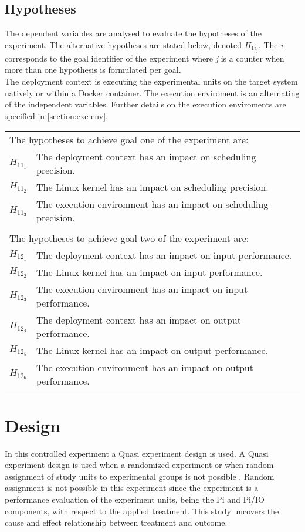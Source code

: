 \subsection{Hypotheses}
The dependent variables are analysed to evaluate the hypotheses of the experiment. The alternative hypotheses are stated below, denoted $H_{1i_{j}}$. The \textit{i} corresponds to the goal identifier of the experiment where \textit{j} is a counter when more than one hypothesis is formulated per goal.\\

The deployment context is executing the experimental units on the target system natively or within a Docker container. The execution enviroment is an alternating of the independent variables. Further details on the execution enviroments are specified in \ref{section:exe-env}.

\begin{table}[H]
\begin{tabular}{l|l}
\multicolumn{2}{l}{The hypotheses to achieve goal one of the experiment are:} \\
$H_{11_{1}}$ & The deployment context has an impact on scheduling precision. \\
$H_{11_{2}}$ & The Linux kernel has an impact on scheduling precision. \\
$H_{11_{3}}$ & The execution environment has an impact on scheduling precision. \\          
\multicolumn{2}{l}{} \\
\multicolumn{2}{l}{The hypotheses to achieve goal two of the experiment are:} \\
$H_{12_{1}}$ & The deployment context has an impact on input performance.\\
$H_{12_{2}}$ & The Linux kernel has an impact on input performance.\\
$H_{12_{3}}$ & The execution environment has an impact on input performance.\\
$H_{12_{4}}$ & The deployment context has an impact on output performance.\\
$H_{12_{5}}$ & The Linux kernel has an impact on output performance.\\
$H_{12_{6}}$ & The execution environment has an impact on output performance.                                                          
\end{tabular}
\end{table}


\section{Design}
In this controlled experiment a Quasi experiment design is used. A Quasi experiment design is used when a randomized experiment or when random assignment of study units to experimental groups is not possible \cite{kampenes}. Random assignment is not possible in this experiment since the experiment is a performance evaluation of the experiment units, being the Pi and Pi/IO components, with respect to the applied treatment. This study uncovers the cause and effect relationship between treatment and outcome. 

